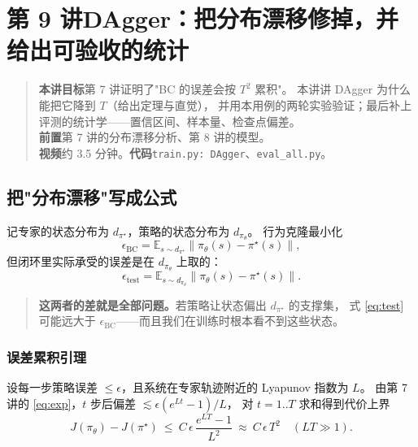 \chapter[DAgger 与评测]{第 9 讲\quad DAgger：把分布漂移修掉，并给出可验收的统计}
\label{ch:dagger}

\begin{quote}\small
\textbf{本讲目标}\quad 第 7 讲证明了"BC 的误差会按 $T^2$ 累积"。
本讲讲 DAgger 为什么能把它降到 $T$（给出定理与直觉），
并用本用例的两轮实验验证；最后补上评测的统计学——置信区间、样本量、检查点偏差。\\[2pt]
\textbf{前置}\quad 第 7 讲的分布漂移分析、第 8 讲的模型。\\
\textbf{视频}\quad 约 3.5 分钟。\quad\textbf{代码}\quad \texttt{train.py: DAgger}、\texttt{eval\_all.py}。
\end{quote}

\section{把"分布漂移"写成公式}

记专家的状态分布为 $d_{\pi^\star}$，策略的状态分布为 $d_{\pi_\theta}$。
行为克隆最小化
\begin{equation}
  \epsilon_{\text{BC}}=\mathbb{E}_{s\sim d_{\pi^\star}}\big\|\pi_\theta(s)-\pi^\star(s)\big\| ,
\end{equation}
但闭环里实际承受的误差是在 $d_{\pi_\theta}$ 上取的：
\begin{equation}
  \epsilon_{\text{test}}=\mathbb{E}_{s\sim d_{\pi_\theta}}\big\|\pi_\theta(s)-\pi^\star(s)\big\| .
  \label{eq:test}
\end{equation}

\begin{quote}
\textbf{这两者的差就是全部问题。}若策略让状态偏出 $d_{\pi^\star}$ 的支撑集，
式 \eqref{eq:test} 可能远大于 $\epsilon_{\text{BC}}$——而且我们在训练时根本看不到这些状态。
\end{quote}

\subsection{误差累积引理}

设每一步策略误差 $\le\epsilon$，且系统在专家轨迹附近的 Lyapunov 指数为 $L$。
由第 7 讲的 \eqref{eq:exp}，$t$ 步后偏差 $\lesssim\epsilon(e^{Lt}-1)/L$，
对 $t=1..T$ 求和得到代价上界
\begin{equation}
  J(\pi_\theta)-J(\pi^\star)\ \le\ C\,\epsilon\,\frac{e^{LT}-1}{L^2}
  \ \approx\ C\,\epsilon\,T^2\quad(LT\gg1).
  \label{eq:t2}
\end{equation}

